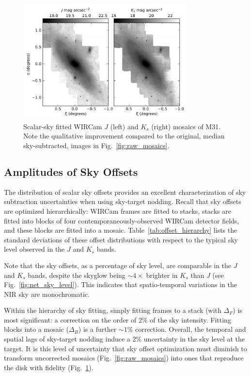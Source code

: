 \documentclass[iop]{emulateapj}
\newcommand{\Fig}[1]{Fig.~\ref{fig:#1}}  %
\newcommand{\Tab}[1]{Table~\ref{tab:#1}}  %
\begin{document}
\begin{figure}[t]
	\centering
		\includegraphics[width=3.5in]{figs/scalar_mosaics}
	\caption{Scalar-sky fitted WIRCam $J$ (left) and $K_s$ (right) mosaics of M31. Note the qualitative improvement compared to the original, median sky-subtracted, images in \Fig{raw_mosaics}.}
	\label{fig:scalar_mosaics}
\end{figure}

\subsection{Amplitudes of Sky Offsets}
\label{sec:offset_amplitudes}

The distribution of scalar sky offsets provides an excellent characterization of sky subtraction uncertainties when using sky-target nodding.
Recall that sky offsets are optimized hierarchically: WIRCam frames are fitted to stacks, stacks are fitted into blocks of four contemporaneously-observed WIRCam detector fields, and these blocks are fitted into a mosaic.
\Tab{offset_hierarchy} lists the standard deviations of these offset distributions with respect to the typical sky level observed in the $J$ and $K_s$ bands.


Note that the sky offsets, as a percentage of sky level, are comparable in the $J$ and $K_s$ bands, despite the skyglow being $\sim 4\times$ brighter in $K_s$ than $J$ (see \Fig{net_sky_level}).
This indicates that spatio-temporal variations in the NIR sky are monochromatic.

Within the hierarchy of sky fitting, simply fitting frames to a stack (with $\Delta_F$) is most significant: a correction on the order of 2\% of the sky intensity.
Fitting blocks into a mosaic ($\Delta_B$) is a further $\sim 1$\% correction.
Overall, the temporal and spatial lags of sky-target nodding induce a 2\% uncertainty in the sky level at the target.
It is this level of uncertainty that sky offset optimization must diminish to transform uncorrected mosaics (\Fig{raw_mosaics}) into ones that reproduce the disk with fidelity (\Fig{scalar_mosaics}).
\end{document}
